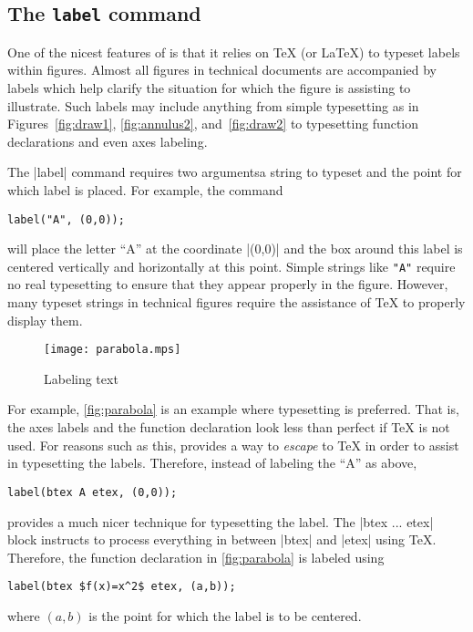 \subsection{The \texttt{label} command}

One of the nicest features of \MP{} is that it relies on \TeX{} (or
\LaTeX) to typeset labels within figures.  Almost all figures in
technical documents are accompanied by labels which help clarify the
situation for which the figure is assisting to illustrate.  Such labels
may include anything from simple typesetting as in
Figures~\ref{fig:draw1}, \ref{fig:annulus2}, and~\ref{fig:draw2} to
typesetting function declarations and even axes labeling.

The |label| command requires two arguments\Dash a string to typeset and
the point for which label is placed.  For example, the command

\begin{lstlisting}[style=MP]
label("A", (0,0));
\end{lstlisting}
will place the letter ``A'' at the coordinate |(0,0)| and the box around
this label is centered vertically and horizontally at this point.
Simple strings like \lstinline[style=text]{"A"} require no real
typesetting to ensure that they appear properly in the figure.  However,
many typeset strings in technical figures require the assistance of
\TeX{} to properly display them.

\begin{figure}
  \centering
  \texttt{[image: parabola.mps]}
  \caption{Labeling text}
  \label{fig:parabola}
\end{figure}

For example, \autoref{fig:parabola} is an example where typesetting is
preferred.  That is, the axes labels and the function declaration look
less than perfect if \TeX{} is not used.  For reasons such as this,
\MP{} provides a way to \textit{escape} to \TeX{} in order to assist in
typesetting the labels.  Therefore, instead of labeling the ``A'' as
above,

\begin{lstlisting}[style=MP]
label(btex A etex, (0,0));
\end{lstlisting}
provides a much nicer technique for typesetting the label.  The
|btex ... etex| block instructs \MP{} to process everything in between
|btex| and |etex| using \TeX.  Therefore, the function declaration in
\autoref{fig:parabola} is labeled using

\begin{lstlisting}[style=MP]
label(btex $f(x)=x^2$ etex, (a,b));
\end{lstlisting}
where $(a,b)$ is the point for which the label is to be centered.

